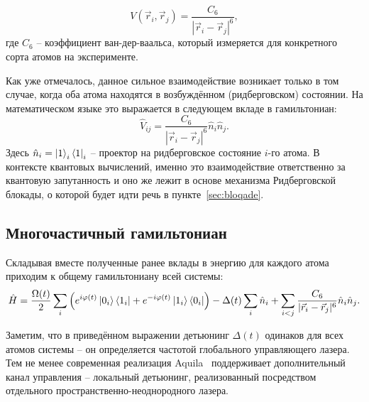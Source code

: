 \begin{equation}\label{eqn:van_der_waals_interaction}
    V(\vec{r}_i, \vec{r}_j) = \frac{C_6}{|\vec{r}_i - \vec{r}_j|^6},
\end{equation}
где $C_6$ -- коэффициент ван-дер-ваальса, который измеряется для конкретного сорта атомов на эксперименте.

Как уже отмечалось, данное сильное взаимодействие возникает только в том случае, когда оба атома находятся в возбуждённом (ридберговском) состоянии.
На математическом языке это выражается в следующем вкладе в гамильтониан:
\begin{equation}
    \hat{V}_{ij} = \frac{C_6}{|\vec{r}_i - \vec{r}_j|^6} \hat{n}_i \hat{n}_j.
\end{equation}
Здесь $\hat{n}_i = \ket{1}_i \bra{1}_i$ -- проектор на ридберговское состояние $i$-го атома. 
В контексте квантовых вычислений, именно это взаимодействие ответственно за квантовую запутанность и оно же лежит в основе механизма Ридберговской блокады,
о которой будет идти речь в пункте~\ref{sec:bloqade}.


\subsection{Многочастичный гамильтониан}
\label{seс:manybody_hamiltonian}
Складывая вместе полученные ранее вклады в энергию для каждого атома приходим к общему гамильтониану всей системы:
\begin{equation}
    \hat{H} = \frac{\Omega(t)}{2} \sum_{i} \left(e^{i \varphi(t)} \ket{0_i} \bra{1_i} + e^{-i \varphi(t)} \ket{1_i} \bra{0_i} \right) - \Delta(t) \sum_i \hat{n}_i + \sum_{i < j} \frac{C_6}{|\vec{r}_i - \vec{r}_j|^6} \hat{n}_i \hat{n}_j.
\end{equation}

Заметим, что в приведённом выражении детьюнинг $\Delta(t)$ одинаков для всех атомов системы -- он определяется частотой глобального управляющего лазера.
Тем не менее современная реализация Aquila~\cite{wurtz2023aquila} поддерживает дополнительный канал управления -- локальный детьюнинг,
реализованный посредством отдельного пространственно-неоднородного лазера.

